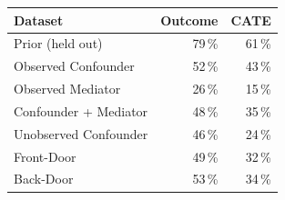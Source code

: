 \begin{tabular}{lrr}
\toprule
Dataset & Outcome & CATE \\
\midrule
Prior (held out) & 79\,\% & 61\,\% \\
Observed Confounder & 52\,\% & 43\,\% \\
Observed Mediator & 26\,\% & 15\,\% \\
Confounder + Mediator & 48\,\% & 35\,\% \\
Unobserved Confounder & 46\,\% & 24\,\% \\
Front-Door & 49\,\% & 32\,\% \\
Back-Door & 53\,\% & 34\,\% \\
\bottomrule
\end{tabular}
